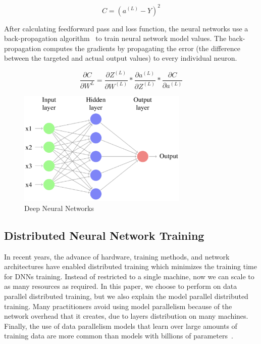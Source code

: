 \documentclass[conference]{IEEEtran}
\begin{document}
\begin{equation}
C = ( a^{(L)} - Y )^2
\end{equation}

After calculating feedforward pass and loss function, the neural networks use a back-propagation algorithm~\cite{rumelhart:errorpropnonote} to train neural network model values. The back-propagation computes the gradients by propagating the error (the difference between the targeted and actual output values) to every individual neuron.

\begin{equation}
\frac{\partial{C}}{\partial{W^{L}}} = \frac{\partial{Z}^{(L)}}{\partial{W^{(L)}}} * \frac{\partial{a^{(L)}}}{\partial{Z^{(L)}}} *  \frac{\partial{C}}{\partial{a^{(L)}}}
\end{equation} 



\begin{figure}[htb]
\includegraphics[width=3.2in]{Fig/DNN_1}
\caption{Deep Neural Networks}
\label{fig:DDNNs}
\end{figure}


\subsection{Distributed Neural Network Training}

In recent years, the advance of hardware, training methods, and network architectures have enabled distributed training which minimizes the training time for DNNs training. Instead of restricted to a single machine, now we can scale to as many resources as required. In this paper, we choose to perform on data parallel distributed training, but we also explain the model parallel distributed training. Many practitioners avoid using model parallelism because of the network overhead that it creates, due to layers distribution on many machines. Finally, the use of data parallelism models that learn over large amounts of training data are more common than models with billions of parameters~\cite{li2015malt}. 
\end{document}
